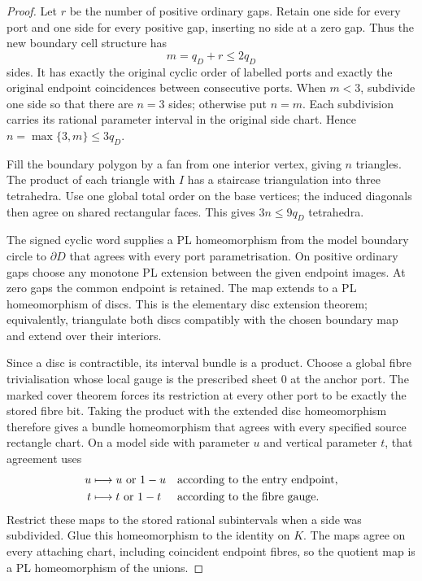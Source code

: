 \begin{proof}
Let $r$ be the number of positive ordinary gaps.  Retain one side for every
port and one side for every positive gap, inserting no side at a zero gap.
Thus the new boundary cell structure has
\[
 m=q_D+r\leq2q_D
\]
sides.  It has exactly the original cyclic order of labelled ports and
exactly the original endpoint coincidences between consecutive ports.
When $m<3$, subdivide one side so that there are $n=3$ sides; otherwise put
$n=m$.  Each subdivision carries its rational parameter interval in the
original side chart.  Hence $n=\max\{3,m\}\leq3q_D$.

Fill the boundary polygon by a fan from one interior vertex, giving $n$
triangles.  The product of each triangle with $I$ has a staircase
triangulation into three tetrahedra.  Use one global total order on the
base vertices; the induced diagonals then agree on shared rectangular
faces.  This gives $3n\leq9q_D$ tetrahedra.

The signed cyclic word supplies a PL homeomorphism from the model boundary
circle to $\partial D$ that agrees with every port parametrisation.  On
positive ordinary gaps choose any monotone PL extension between the given
endpoint images.  At zero gaps the common endpoint is retained.  The map
extends to a PL homeomorphism of discs.  This is the elementary disc
extension theorem; equivalently, triangulate both discs compatibly with the
chosen boundary map and extend over their interiors.

Since a disc is contractible, its interval bundle is a product.  Choose a
global fibre trivialisation whose local gauge is the prescribed sheet $0$
at the anchor port.  The marked cover theorem forces its restriction at
every other port to be exactly the stored fibre bit.  Taking the product
with the extended disc homeomorphism therefore gives a bundle homeomorphism
that agrees with every specified source rectangle chart.  On a model side
with parameter $u$ and vertical parameter $t$, that agreement uses
\[
\begin{aligned}
 u&\longmapsto u\ \hbox{or}\ 1-u
 &&\text{according to the entry endpoint},\\
 t&\longmapsto t\ \hbox{or}\ 1-t
 &&\text{according to the fibre gauge}.
\end{aligned}
\]
Restrict these maps to the stored rational subintervals when a side was
subdivided.  Glue this homeomorphism to the identity on $K$.  The maps agree
on every attaching chart, including coincident endpoint fibres, so the
quotient map is a PL homeomorphism of the unions.


\end{proof}
